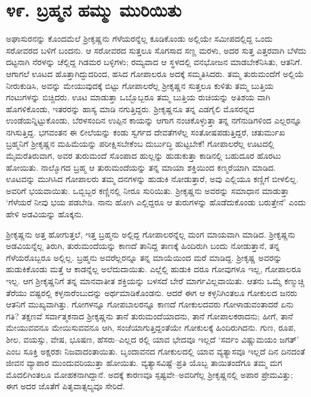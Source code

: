 
\chapter{೪೯. ಬ್ರಹ್ಮನ ಹಮ್ಮು ಮುರಿಯಿತು}

ಅಘಾಸುರನನ್ನು ಕೊಂದಮೆಲೆ ಶ್ರೀಕೃಷ್ಣನು ಗೆಳೆಯರನ್ನೆಲ್ಲ ಕೂಡಿಕೊಂಡು ಅಲ್ಲಿಯೇ ಸಮೀಪದಲ್ಲಿದ್ದ ಒಂದು ಸರೋವರದ ಬಳಿಗೆ ಬಂದನು. ಆ ಸರೋವರದ ಸುತ್ತಲೂ ಸೊಗಸಾದ ಸಣ್ಣ ಮರಳು, ಅದರ ಸುತ್ತ ಎತ್ತರವಾಗಿ ಬೆಳೆದು ದಟ್ಟನಾಗಿ ನೆರಳನ್ನು ಚೆಲ್ಲಿದ್ದ ಗಿಡಮರ ಬಳ್ಳಿಗಳು; ರಮ್ಯವಾದ ಆ ಸ್ಥಳದಲ್ಲಿ ವನಭೋಜನ ಮಾಡಬೇಕೆನಿಸಿತು, ಆತನಿಗೆ. ಆಗಾಗಲೆ ಊಟದ ಹೊತ್ತಾಗಿದ್ದುದರಿಂದ, ಹಸಿದ ಗೋಪಾಲರೂ ಅದಕ್ಕೆ ಸಮ್ಮತಿಸಿದರು. ತಮ್ಮ ತುರುಮಂದೆಗೆ ಅಲ್ಲಿಯೆ ನೀರುಕುಡಿಸಿ, ಅವನ್ನು ಮೇಯುವುದಕ್ಕೆ ಬಿಟ್ಟು ಗೋಪಾಲರೆಲ್ಲ ಶ್ರೀಕೃಷ್ಣನ ಸುತ್ತಲೂ ಕುಳಿತು ತಮ್ಮ ಬುತ್ತಿಯ ಗಂಟುಗಳನ್ನು ಬಿಚ್ಚಿದರು. ಊಟ ಮಾಡುತ್ತಾ ಒಬ್ಬೊಬ್ಬರೂ ತಮ್ಮ ಬುತ್ತಿಯ ರುಚಿಯನ್ನು ಅತಿಶಯ ವಾಗಿ ಹೊಗಳಿಕೊಂಡು, ಇತರರನ್ನು ಹಾಸ್ಯ ಮಾಡಿ ನಗುತ್ತಿದ್ದರು. ಶ್ರೀಕೃಷ್ಣನೂ ತನ್ನ ಎಡಗೈಲಿ ಮೊಸರನ್ನದ ಉಂಡೆಯನ್ನಿಟ್ಟುಕೊಂಡು, ಬೆರಳಸಂದಿನ ಉಪ್ಪಿನ ಕಾಯನ್ನು ಆಗಾಗ ನಂಚಿಕೊಳ್ಳುತ್ತಾ ತನ್ನ ನಗೆನುಡಿಗಳಿಂದ ಎಲ್ಲರನ್ನೂ ನಗಿಸುತ್ತಿದ್ದ. ಭಗವಂತನ ಈ ಲೀಲೆಯನ್ನು ಕಂಡು ಸ್ವರ್ಗದ ದೇವತೆಗಳೆಲ್ಲ ಸಂತೋಷಪಡುತ್ತಿದ್ದರೆ, ಚತುರ್ಮುಖ ಬ್ರಹ್ಮನಿಗೆ ಶ್ರೀಕೃಷ್ಣನ ಮಹಿಮೆಯನ್ನು ಪರೀಕ್ಷಿಸಬೇಕೆಂಬ ದುರ್ಬುದ್ಧಿ ಹುಟ್ಟಬೇಕೆ! ಗೋಪಾಲರೆಲ್ಲ ಊಟದಲ್ಲಿ ಮೈಮರೆತಿರುವಾಗ, ಅವರ ತುರುಮಂದೆ ಸೊಂಪಾದ ಹುಲ್ಲನ್ನು ಹುಡುಕುತ್ತಾ ಕಾಡಿನಲ್ಲಿ ಬಹುದೂರ ಹೊರಟು ಹೋಯಿತು. ನಾಲ್ಮೊಗದ ಬ್ರಹ್ಮ ಆ ತುರುಮಂದೆಯನ್ನು ತನ್ನ ಮಾಯಾ ಶಕ್ತಿಯಿಂದ ಕಣ್ಮರೆಯಾಗಿ ಮಾಡಿದ. ಊಟವನ್ನು ಮುಗಿಸಿದ ಗೋಪಾಲರು ತಮ್ಮ ದನಗಳನ್ನು ಹುಡುಕಿ ನೋಡುತ್ತಾರೆ, ಅವು ಎಲ್ಲಿಯೂ ಕಣ್ಣಿಗೆ ಬೀಳಲಿಲ್ಲ. ಅವರಿಗೆ ಭಯವಾಯಿತು. ಒಬ್ಬಿಬ್ಬರ ಕಣ್ಣಿನಲ್ಲಿ ನೀರೂ ಸುರಿಯಿತು. ಶ್ರೀಕೃಷ್ಣನು ಅವರನ್ನು ಸಮಾಧಾನ ಮಾಡುತ್ತಾ ‘ಗೆಳೆಯರೆ ನೀವು ಭಯ ಪಡಬೇಡಿ. ನಾನು ಹೋಗಿ ಎಲ್ಲಿದ್ದರೂ ಆ ತುರುಗಳನ್ನು ಹೊಡೆದುಕೊಂಡು ಬರುತ್ತೇನೆ’ ಎಂದು ಹೇಳಿ ಅಡವಿಯನ್ನು ಹೊಕ್ಕನು.

ಶ್ರೀಕೃಷ್ಣನು ಅತ್ತ ಹೋಗುತ್ತಲೆ, ಇತ್ತ ಬ್ರಹ್ಮನು ಅಲ್ಲಿದ್ದ ಗೋಪಾಲರನ್ನೆಲ್ಲ ಮಂಗ ಮಾಯವಾಗಿ ಮಾಡಿದ. ಶ್ರೀಕೃಷ್ಣನು ಅಡವಿಯನ್ನೆಲ್ಲ ತಿರುಗಿ, ತುರುಮಂದೆಯನ್ನು ಕಾಣದೆ ತಾನಿದ್ದ ತಾಣಕ್ಕೆ ಹಿಂದಿರುಗಿ ಬಂದು ನೋಡುತ್ತಾನೆ, ತನ್ನ ಗೆಳೆಯರೊಬ್ಬರೂ ಅಲ್ಲಿಲ್ಲ. ಬ್ರಹ್ಮನು ಅವರೆಲ್ಲರನ್ನೂ ತನ್ನ ಮಾಯೆಯಿಂದ ಮರೆ ಮಾಡಿದ್ದ. ಶ್ರೀಕೃಷ್ಣ ಅವರನ್ನು ಹುಡುಕಿಕೊಂಡು ಮತ್ತೆ ಆ ಕಾಡನ್ನೆಲ್ಲ ಅಲೆದುದಾಯಿತು. ಎಲ್ಲೆಲ್ಲಿ ಹುಡುಕಿ ದರೂ ಗೋವುಗಳೂ ಇಲ್ಲ, ಗೋಪಾಲರೂ ಇಲ್ಲ. ಆಗ ಶ್ರೀಕೃಷ್ಣನಿಗೆ ತನ್ನ ಮಾನವಾತೀತ ಶಕ್ತಿಯನ್ನು ಬಳಸದೆ ಬೇರೆ ಮಾರ್ಗವಿಲ್ಲವಾಯಿತು. ಆತನು ಒಮ್ಮೆ ಕಣ್ಮುಚ್ಚಿ ತೆರೆಯು ವಷ್ಟರಲ್ಲಿ ಕಳ್ಳನಾರೆಂಬುದನ್ನು ಅರ್ಥಮಾಡಿಕೊಂಡನು. ಆದರೆ ಈಗ ಆ ಕಳ್ಳನಿಗಿಂತಲೂ ಗೋಕುಲದ ಜನರು ಆತನಿಗೆ ಮುಖ್ಯವಾಗಿತ್ತು. ಗೋಗಳನ್ನೂ ಗೋಪಬಾಲರನ್ನೂ ಕಾಣದೆ ಗೋಕುಲದವರು ಗೋಳಾಡುವಂತಾದರೆ ಏನು ಗತಿ? ತಕ್ಷಣವೆ ಸರ್ವಾತ್ಮಕನಾದ ಶ್ರೀಕೃಷ್ಣನು ತಾನೆ ತುರುಮಂದೆಯಾದನು, ತಾನೆ ಗೋಪಾಲಕರಾದನು; ಹೀಗೆ, ತಾನೆ ಮೇಯುವವನೂ ಮೇಯಿಸುವವನೂ ಆಗಿ, ಸಂಜೆಯಾಗುತ್ತಿದ್ದಂತೆಯೇ ಗೋಕುಲಕ್ಕೆ ಹಿಂದಿರುಗಿದನು. ಗುಣ, ರೂಪ, ಶೀಲ, ವಯಸ್ಸು, ವೇಷ, ಭೂಷಣ, ಹೆಸರು–ಎಲ್ಲದ ರಲ್ಲಿ ಯಾವ ಭೇದವೂ ಇಲ್ಲದೆ ‘ಸರ್ವಂ ವಿಷ್ಣುಮಯಂ ಜಗತ್​’ ಎಂಬ ಸೂಕ್ತಿ ಅಕ್ಷರಶಃ ನಿಜವಾದಂತಾಯಿತು. ಬೃಂದಾವನದ ಗೋಕುಲದಲ್ಲಿ ಯಾವ ವ್ಯತ್ಯಾಸವೂ ಇಲ್ಲದೆ ದಿನ ದಿನದಂತೆ ಜೀವನ ವ್ಯಾಪಾರ ಮುಂದುವರಿಯುತ್ತಾ ಹೋಯಿತು. ವ್ಯತ್ಯಾಸವಿಷ್ಟೆ–ಪ್ರತಿ ಯೊಬ್ಬ ತಾಯಿತಂದೆಗೂ ತಮ್ಮ ಮಗ ಮೊದಲಿಗಿಂತಲೂ ಮೋಹಕನಾಗಿದ್ದಾನೆ. ಅದಕ್ಕೆ ಕಾರಣವೂ ಸ್ಪಷ್ಟವೇ–ಅವರಿಗೆಲ್ಲ ಶ್ರೀಕೃಷ್ಣನಲ್ಲಿ ಅಪಾರ ಪ್ರೇಮವಿತ್ತು; ಈಗ ಅದರ ಜೊತೆಗೆ ಪಿತೃವಾತ್ಸಲ್ಯವೂ ಸೇರಿದೆ.

